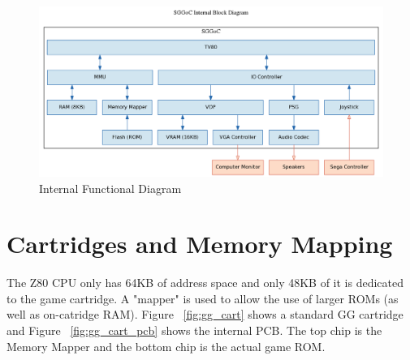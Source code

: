 \documentclass{article}
\begin{document}
\begin{figure}[H]
\centering
\includegraphics[scale=0.4]{../block_diagrams/block_diagram_internal.png}
\caption{Internal Functional Diagram}
\label{fig:internal}
\end{figure}

\newpage
\section{Cartridges and Memory Mapping}

The Z80 CPU only has 64KB of address space and only 48KB of it is
dedicated to the game cartridge. A "mapper" is used to allow the use of
larger ROMs (as well as on-catridge RAM). Figure ~\ref{fig:gg_cart}
shows a standard GG cartridge and Figure ~\ref{fig:gg_cart_pcb} shows
the internal PCB. The top chip is the Memory Mapper and the bottom chip
is the actual game ROM.
\end{document}
